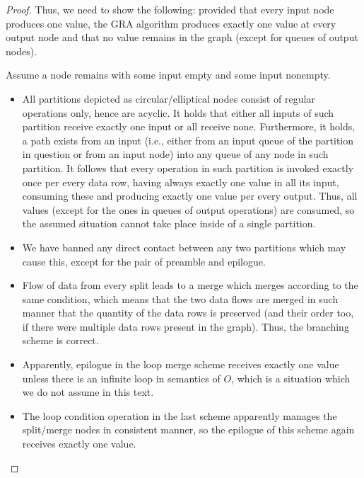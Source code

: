   \begin{proof} 
    Thus, we need to show the following: provided that every input node produces one value, the GRA algorithm produces exactly one value at every output node and that no value remains in the graph (except for queues of output nodes).

        Assume a node remains with some input empty and some input nonempty. 
        \begin{itemize}
          \item All partitions depicted as circular/elliptical nodes consist of regular operations only, hence are acyclic. It holds that either all inputs of such partition receive exactly one input or all receive none. Furthermore, it holds, a path exists from an input (i.e., either from an input queue of the partition in question or from an input node) into any queue of any node in such partition. It follows that every operation in such partition is invoked exactly once per every data row, having always exactly one value in all its input, consuming these and producing exactly one value per every output. Thus, all values (except for the ones in queues of output operations) are consumed, so the assumed situation cannot take place inside of a single partition.  
          \item We have banned any direct contact between any two partitions which may cause this, except for the pair of preamble and epilogue.
          \item Flow of data from every split leads to a merge which merges according to the same condition, which means that the two data flows are merged in such manner that the quantity of the data rows is preserved (and their order too, if there were multiple data rows present in the graph). Thus, the branching scheme is correct.
          \item Apparently, epilogue in the loop merge scheme receives exactly one value unless there is an infinite loop in semantics of $O$, which is a situation which we do not assume in this text.
          \item The loop condition operation in the last scheme apparently manages the split/merge nodes in consistent manner, so the epilogue of this scheme again receives exactly one value.
        \end{itemize}

  \end{proof}
\myendobs

